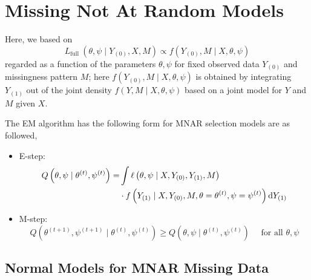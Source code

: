 \begin{example}
	
\end{example}

\section{Missing Not At Random Models}

Here, we based on
\begin{equation}
	L_{\text {full }}\left(\theta, \psi \mid Y_{(0)}, X, M\right) \propto f\left(Y_{(0)}, M \mid X, \theta, \psi\right)
\end{equation}
regarded as a function of the parameters $\theta, \psi$ for fixed observed data $Y_{(0)}$ and missingness pattern $M$; here $f\left(Y_{(0)}, M \mid X, \theta, \psi\right)$ is obtained by integrating $Y_{(1)}$ out of the joint density $f(Y, M \mid X, \theta, \psi)$ based on a joint model for $Y$ and $M$ given $X$.

The EM algorithm has the following form for MNAR selection models are as followed,
\begin{itemize}
	\item E-step:
	      \begin{equation}
		      \begin{aligned}
			      Q\left(\theta, \psi \mid \theta^{(t)}, \psi^{(t)}\right)= & \int \ell\left(\theta, \psi \mid X, Y_{(0)}, Y_{(1)}, M\right)                                   \\
			                                                                & \cdot f\left(Y_{(1)}\mid X, Y_{(0)}, M, \theta=\theta^{(t)}, \psi=\psi^{(t)}\right) \mathop{}\!\mathrm{d} Y_{(1)}
		      \end{aligned}
	      \end{equation}
	\item M-step:
	      \begin{equation}
		      Q\left(\theta^{(t+1)}, \psi^{(t+1)} \mid \theta^{(t)}, \psi^{(t)}\right) \geq Q\left(\theta, \psi \mid \theta^{(t)}, \psi^{(t)}\right) \quad \text { for all } \theta, \psi
	      \end{equation}
\end{itemize}

\subsection{Normal Models for MNAR Missing Data}

